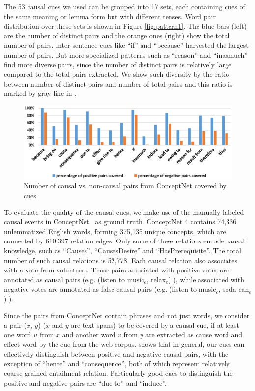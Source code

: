 The 53 causal cues we used can be grouped into 17 sets, each
containing cues of the same meaning or lemma form but with different
tenses. Word pair distribution over these sets is shown in Figure
\ref{fig:pattern1}. The blue bars (left) are the number of distinct
pairs and the orange ones (right) show the total number of pairs.
Inter-sentence cues like ``if'' and ``because'' harvested the
largest number of pairs. But more specialized patterns such as
``reason'' and ``inasmuch'' find more diverse pairs, since the
number of distinct pairs is relatively large compared to the total
pairs extracted.
We show such diversity by the ratio between number of distinct pairs
and number of total pairs
and this ratio is marked by gray line in .

\begin{figure}[th]
\centering
\includegraphics[width=1.6\columnwidth]{pattern2}
\caption{Number of causal vs. non-causal pairs from ConceptNet covered by cues}
\label{fig:pattern2}
\end{figure}
To evaluate the quality of the causal cues, we make use of the
manually labeled causal events in
ConceptNet~\cite{liu2004commonsense} as ground truth. ConceptNet 4
contains 74,336 unlemmatized English words, forming
375,135 unique concepts, which are connected by 610,397 relation edges.
Only some of these relations encode causal knowledge,
such as ``Causes'', ``CausesDesire'' and ``HasPrerequisite''.
The total number of such causal relations is 52,778.
Each causal relation also associates with a vote from volunteers.
Those pairs associated with positive votes are annotated as causal pairs
(e.g. (listen to music$_c$, relax$_e$) ),
while associated with negative votes are annotated as false causal pairs
(e.g. (listen to music$_c$, soda can$_e$) ).

Since the pairs from ConceptNet contain
phrases and not just words, we consider a pair ($x$, $y$)
($x$ and $y$ are text spans) to be covered by a
causal cue, if at least one word $u$ from $x$ and another word $v$ from
$y$ are extracted as cause word and effect word by the cue
from the web corpus.
 shows that in general, our cues can
effectively distinguish between positive and negative causal pairs,
with the exception of ``hence'' and ``consequence'', both of which
represent relatively coarse-grained entailment relation.
Particularly good cues to distinguish the positive and negative
pairs are ``due to'' and ``induce''.

